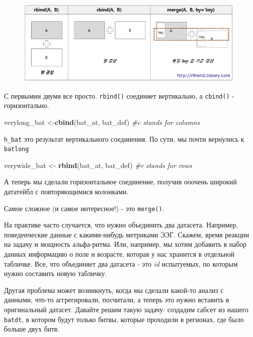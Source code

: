 \documentclass[]{book}
\newenvironment{Shaded}{\begin{snugshade}}{\end{snugshade}}
\newcommand{\KeywordTok}[1]{\textcolor[rgb]{0.13,0.29,0.53}{\textbf{#1}}}
\newcommand{\StringTok}[1]{\textcolor[rgb]{0.31,0.60,0.02}{#1}}
\newcommand{\CommentTok}[1]{\textcolor[rgb]{0.56,0.35,0.01}{\textit{#1}}}
\newcommand{\NormalTok}[1]{#1}
\begin{document}
\begin{figure}
\centering
\includegraphics{images/R_rbind_cbind.png}
\caption{}
\end{figure}

С первымии двумя все просто. \texttt{rbind()} соединяет вертикально, а
\texttt{cbind()} - горизонтально.

\begin{Shaded}
\begin{Highlighting}[]
\NormalTok{verylong_bat <-}\KeywordTok{cbind}\NormalTok{(bat_at, bat_def) }\CommentTok{#c stands for columns}
\end{Highlighting}
\end{Shaded}

\texttt{h\_bat} это результат вертикального соединения. По сути, мы
почти вернулись к \texttt{batlong}

\begin{Shaded}
\begin{Highlighting}[]
\NormalTok{verywide_bat <-}\StringTok{ }\KeywordTok{rbind}\NormalTok{(bat_at, bat_def) }\CommentTok{#r stands for rows}
\end{Highlighting}
\end{Shaded}

А теперь мы сделали горизонтальное соединение, получив ооочень широкий
дататейбл с повторяющимися колонками.

Самое сложное (и самое интересное!) - это \texttt{merge()}.

На практике часто случается, что нужно объединить два датасета.
Например, поведенческие данные с какими-нибудь метриками ЭЭГ. Скажем,
время реакции на задачу и мощность альфа-ритма. Или, например, мы хотим
добавить в набор данных информацию о поле и возрасте, которая у нас
хранится в отдельной табличке. Все, что объединяет два датасета - это
\emph{id} испытуемых, по которым нужно составить новую табличку.

Другая проблема может возникнуть, когда мы сделали какой-то анализ с
данными, что-то аггрегировали, посчитали, а теперь это нужно вставить в
оригинальный датасет. Давайте решим такую задачу: создадим сабсет из
нашего \texttt{batdt}, в котором будут только битвы, которые проходили в
регионах, где было больше двух битв.
\end{document}
